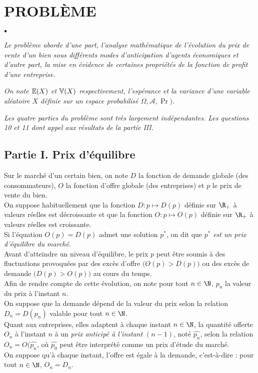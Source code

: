 \documentclass[11pt]{article}%
\begin{document}
\section*{PROBL\`{E}ME}

\begin{noliste}{$\scriptstyle \bullet$}

\item \textit{Le problème aborde d'une part, l'analyse mathématique de
l'évolution du prix de vente d'un bien sous différents modes
d'anticipation d'agents économiques et d'autre part, la mise en
évidence de certaines propriétés de la fonction de profit d'une
entreprise. }

\item \textit{On note $\mathbb{E}(X)$ et $\mathbb{V}(X)$ respectivement, l'espérance et
la variance d'une variable aléatoire $X$ définie sur un espace
probabilisé $\Omega, \mathcal{A}, \Pr)$.}

\item \textit{Les quatre parties du problème sont très largement
indépendantes. Les questions 10 et 11 dont appel aux résultats de la
partie III.} \\

\end{noliste}

\subsection*{Partie I. Prix d'équilibre}

\noindent Sur le marché d'un certain bien, on note $D$ la fonction de
demande globale (des consommateurs), $O$ la fonction d'offre globale
(des entreprises) et $p$ le prix de vente du bien. \\
On suppose habituellement que la fonction $D : p \mapsto D(p)$ définie
sur $\R_+ $ à valeurs réelles est décroissante et que la fonction $O :
p \mapsto O(p)$ définie sur $\R_+ $ à valeurs réelles est croissante.
\\
Si l'équation $O(p) = D(p)$ admet une solution $p^{\ast}$, on dit que
$p^{\ast}$ \textit{est un prix d'équilibre du marché}. \\
Avant d'atteindre un niveau d'équilibre, le prix $p$ peut être soumis à
des fluctuations provoquées par des excès d'offre $\big(O(p) >
D(p)\big)$ ou des excès de demande $\big(D(p) > O(p)\big)$ au cours du
temps. \\
Afin de rendre compte de cette évolution, on note pour tout $n \in \N$,
$p_{n}$ la valeur du prix à l'instant $n$. \\
On suppose que la demande dépend de la valeur du prix selon la relation
$D_{n} = D(p_{n})$ valable pour tout $n \in \N$. \\
Quant aux entreprises, elles adaptent à chaque instant $n \in \N$, la
quantité offerte $O_{n}$ à l'instant $n$ à un \textit{prix anticipé à
l'instant} $(n-1)$, noté $\widehat{p_{n}}$, selon la relation $O_{n} =
O(\widehat{p_{n}}$, où $\widehat{p_{0}}$ peut être interprété comme un
prix d'étude du marché. \\
On suppose qu'à chaque instant, l'offre est égale à la demande,
c'est-à-dire : pour tout $n \in \N$, $O_{n} = D_{n}$. \\
\end{document}
